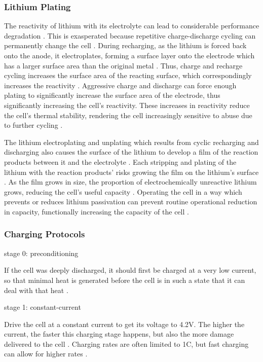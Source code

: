 \subsubsection{Lithium Plating}
The reactivity of lithium with its electrolyte can lead to considerable performance degradation \cite{HANDBOOK}. 
This is exasperated because repetitive charge-discharge cycling can permanently change the cell \cite{HANDBOOK}.
During recharging, as the lithium is forced back onto the anode, it electroplates, forming a surface layer onto the electrode which has a larger surface area than the original metal \cite{HANDBOOK}. 
Thus, charge and recharge cycling increases the surface area of the reacting surface, which correspondingly increases the reactivity \cite{HANDBOOK}. 
Aggressive charge and discharge can force enough plating to significantly increase the surface area of the electrode, thus significantly increasing the cell's reactivity.
These increases in reactivity reduce the cell's thermal stability, rendering the cell increasingly sensitive to abuse due to further cycling \cite{HANDBOOK}.

The lithium electroplating and unplating which results from cyclic recharging and discharging also causes the surface of the lithium to develop a film of the reaction products between it and the electrolyte \cite{HANDBOOK}. 
Each stripping and plating of the lithium with the reaction products' risks growing the film on the lithium's surface \cite{HANDBOOK}. 
As the film grows in size, the proportion of electrochemically unreactive lithium grows, reducing the cell's useful capacity \cite{HANDBOOK}.
Operating the cell in a way which prevents or reduces lithium passivation can prevent routine operational reduction in capacity, functionally increasing the capacity of the cell \cite{HANDBOOK}.

\subsubsection{Charging Protocols}

stage 0: preconditioning

If the cell was deeply discharged, it should first be charged at a very low current, so that minimal heat is generated before the cell is in such a state that it can deal with that heat \cite{DIGIKEY}.

stage 1: constant-current 

Drive the cell at a constant current to get its voltage to 4.2V. The higher the current, the faster this charging stage happens, but also the more damage delivered to the cell \cite{TI}. Charging rates are often limited to 1C, but fast charging can allow for higher rates \cite{TI}.

